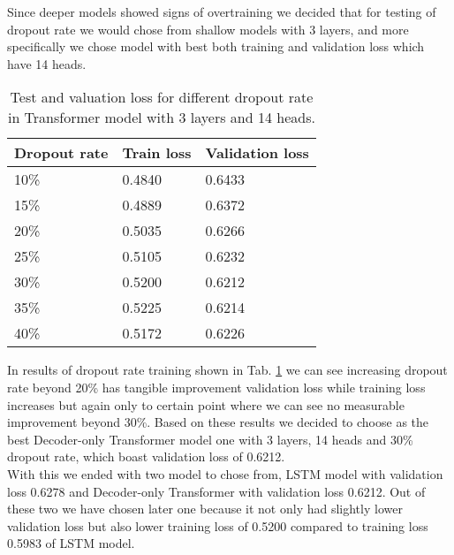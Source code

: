 Since deeper models showed signs of overtraining we decided that for testing of dropout rate we would chose from shallow models with 3 layers, and more specifically we chose model with best both training and validation loss which have 14 heads. 
\\

\begin{table}[!h]
	\centering
	\begin{tabular}{|l|l|l|}
		\hline
		Dropout rate & Train loss & Validation loss \\ \hline
		10\%         & 0.4840    & 0.6433                \\ \hline
		15\%         & 0.4889    & 0.6372                \\ \hline
		20\%         & 0.5035    & 0.6266                \\ \hline
		25\%         & 0.5105    & 0.6232                \\ \hline
		30\%         & 0.5200    & 0.6212                \\ \hline 
		35\%         & 0.5225    & 0.6214                \\ \hline
		40\%         & 0.5172    & 0.6226                \\ \hline 
	\end{tabular}
	\caption{Test and valuation loss for different dropout rate in Transformer model with 3 layers and 14 heads.}
	\label{tab:transformer_dropout}
\end{table}

In results of dropout rate training shown in Tab. \ref{tab:transformer_dropout} we can see increasing dropout rate beyond 20\% has tangible improvement validation loss while training loss increases but again only to certain point where we can see no measurable improvement beyond 30\%. Based on these results we decided to choose as the best Decoder-only Transformer model one with 3 layers, 14 heads and 30\% dropout rate, which boast validation loss of 0.6212.
\\

With this we ended with two model to chose from, LSTM model with validation loss 0.6278 and Decoder-only Transformer with validation loss 0.6212. Out of these two we have chosen later one because it not only had slightly lower validation loss but also lower training loss of 0.5200 compared to training loss 0.5983 of LSTM model. 
